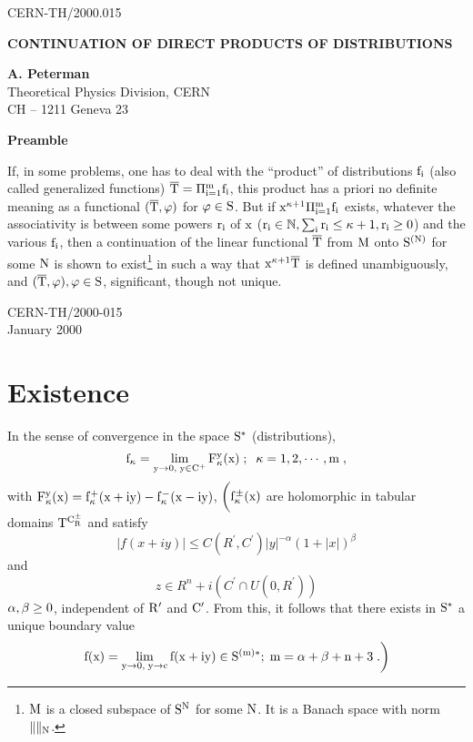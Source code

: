 \documentclass[12pt]{article}
\begin{document}
\vspace*{20mm}
\begin{flushright}
CERN-TH/2000.015
\end{flushright}
\vspace*{1cm}
\begin{center}
{\bf CONTINUATION OF DIRECT PRODUCTS OF DISTRIBUTIONS}
\vspace*{1cm}

{\bf A. Peterman }\\
\vspace{0.3cm}
Theoretical Physics Division,
CERN \\
CH -- 1211 Geneva 23\\
\vspace*{2cm}
 \end{center}

\setcounter{page}{1}
\pagestyle{plain}


\begin{center}{\bf Preamble}\end{center}
If, in some problems, one has to deal with the ``product'' of
distributions
$\rm f_i$ (also called
generalized functions) $\rm\overline T = \Pi^m_{i=1} f_i$, this product
has
a priori no definite meaning
as a functional $(\rm \overline T, \varphi) $ for $\rm\varphi \in S$. But
if $\rm x^{\kappa +1}
\Pi^m_{i=1} f_i$ exists, whatever the associativity is  between some
powers
$\rm r_i$ of $\rm x$ ($\rm
r_i
\in \Bbb N, \sum_i r_i\leq \kappa  +1, r_i \geq 0$) and the various $\rm
f_i$, then a continuation
of the  linear functional $\rm \overline T$ from $\rm M$  onto $\rm
S^{(N)}$  for some $\rm N$
is shown to exist\footnote{$\rm M$ is a closed subspace of $\rm S^N$ for
some $\rm N$. It is a Banach
space with norm
$\rm \|
\|_N $.} in such a way that $\rm x^{\kappa +1} \overline T$ is defined
unambiguously, and $\rm (\overline
T,
\varphi), \varphi \in S$, significant, though not unique.
\vspace*{4cm}
\begin{flushleft}
CERN-TH/2000-015\\
January 2000
\end{flushleft}
\vfill\eject

\section{Existence}

In the sense of convergence in the space $\rm S^*$ (distributions),
$$\rm f_\kappa = \lim_{y \rightarrow 0,\; y \in C^+} F^y_\kappa (x)
\;;\;\;
\kappa = 1,2, \cdots ,
m\;,$$
 with $\rm F^y_\kappa (x) = f^+_\kappa (x +iy) - f^-_\kappa (x - i y)$,
$\bigg(\rm f^\pm_\kappa (x)$ are
holomorphic in tabular domains $\rm T^{C^\pm_R}$ and satisfy
\begin{equation}
|f (x + i y) | \leq C (R^\prime, C^\prime) |y|^{-\alpha} (1+|x|)^\beta
\end{equation}
and
$$
z \in R^n + i (C^\prime
\cap U (0, R^\prime))
$$
$\rm \alpha , \beta \geq 0$, independent of $\rm R^\prime$ and $\rm
C^\prime$. From this, it follows that
there exists in $\rm S^*$ a unique boundary value
$$\left.{\rm f(x) = \lim_{y \rightarrow 0 , \; y \rightarrow c} f(x + iy)
 \in S^{(m) *}; \; m= \alpha +\beta +
n +3\;.}\right)$$
\end{document}

